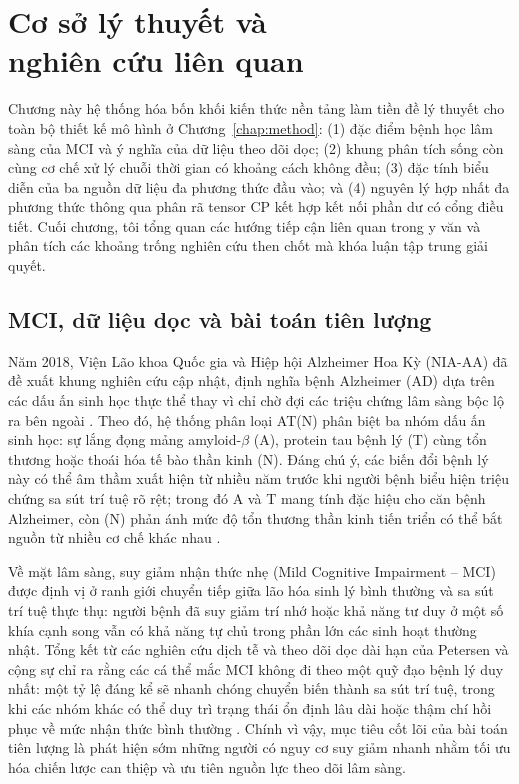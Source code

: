 \chapter[Cơ sở lý thuyết và nghiên cứu liên quan]{Cơ sở lý thuyết và\\nghiên cứu liên quan}
\label{chap:background}

Chương này hệ thống hóa bốn khối kiến thức nền tảng làm tiền đề lý thuyết cho toàn bộ thiết kế mô hình ở Chương~\ref{chap:method}: (1) đặc điểm bệnh học lâm sàng của MCI và ý nghĩa của dữ liệu theo dõi dọc; (2) khung phân tích sống còn cùng cơ chế xử lý chuỗi thời gian có khoảng cách không đều; (3) đặc tính biểu diễn của ba nguồn dữ liệu đa phương thức đầu vào; và (4) nguyên lý hợp nhất đa phương thức thông qua phân rã tensor CP kết hợp kết nối phần dư có cổng điều tiết. Cuối chương, tôi tổng quan các hướng tiếp cận liên quan trong y văn và phân tích các khoảng trống nghiên cứu then chốt mà khóa luận tập trung giải quyết.

\section{MCI, dữ liệu dọc và bài toán tiên lượng}
Năm 2018, Viện Lão khoa Quốc gia và Hiệp hội Alzheimer Hoa Kỳ (NIA-AA) đã đề xuất khung nghiên cứu cập nhật, định nghĩa bệnh Alzheimer (AD) dựa trên các dấu ấn sinh học thực thể thay vì chỉ chờ đợi các triệu chứng lâm sàng bộc lộ ra bên ngoài \cite{jack2018niaaa}. Theo đó, hệ thống phân loại AT(N) phân biệt ba nhóm dấu ấn sinh học: sự lắng đọng mảng amyloid-$\beta$ (A), protein tau bệnh lý (T) cùng tổn thương hoặc thoái hóa tế bào thần kinh (N). Đáng chú ý, các biến đổi bệnh lý này có thể âm thầm xuất hiện từ nhiều năm trước khi người bệnh biểu hiện triệu chứng sa sút trí tuệ rõ rệt; trong đó A và T mang tính đặc hiệu cho căn bệnh Alzheimer, còn (N) phản ánh mức độ tổn thương thần kinh tiến triển có thể bắt nguồn từ nhiều cơ chế khác nhau \cite{jack2018niaaa}.

Về mặt lâm sàng, suy giảm nhận thức nhẹ (Mild Cognitive Impairment -- MCI) được định vị ở ranh giới chuyển tiếp giữa lão hóa sinh lý bình thường và sa sút trí tuệ thực thụ: người bệnh đã suy giảm trí nhớ hoặc khả năng tư duy ở một số khía cạnh song vẫn có khả năng tự chủ trong phần lớn các sinh hoạt thường nhật. Tổng kết từ các nghiên cứu dịch tễ và theo dõi dọc dài hạn của Petersen và cộng sự chỉ ra rằng các cá thể mắc MCI không đi theo một quỹ đạo bệnh lý duy nhất: một tỷ lệ đáng kể sẽ nhanh chóng chuyển biến thành sa sút trí tuệ, trong khi các nhóm khác có thể duy trì trạng thái ổn định lâu dài hoặc thậm chí hồi phục về mức nhận thức bình thường \cite{petersen2018mci}. Chính vì vậy, mục tiêu cốt lõi của bài toán tiên lượng là phát hiện sớm những người có nguy cơ suy giảm nhanh nhằm tối ưu hóa chiến lược can thiệp và ưu tiên nguồn lực theo dõi lâm sàng.

